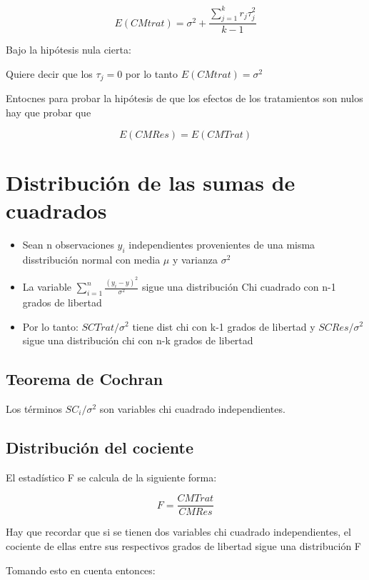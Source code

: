 \documentclass[
]{article}
\begin{document}
\[
E(CMtrat)=\sigma^2+\frac{\sum^k_{j=1}r_j\tau^2_j}{k-1}
\]

Bajo la hipótesis nula cierta:

Quiere decir que los \(\tau_j=0\) por lo tanto \(E(CMtrat)=\sigma^2\)

Entocnes para probar la hipótesis de que los efectos de los tratamientos
son nulos hay que probar que

\[
E(CMRes)=E(CMTrat)
\]

\section{Distribución de las sumas de
cuadrados}\label{distribuciuxf3n-de-las-sumas-de-cuadrados}

\begin{itemize}
\item
  Sean n observaciones \(y_i\) independientes provenientes de una misma
  disstribución normal con media \(\mu\) y varianza \(\sigma^2\)
\item
  La variable \(\sum^n_{i=1}\frac{(y_i-y)^2}{\sigma^2}\) sigue una
  distribución Chi cuadrado con n-1 grados de libertad
\item
  Por lo tanto: \(SCTrat/\sigma^2\) tiene dist chi con k-1 grados de
  libertad y \(SCRes/\sigma^2\) sigue una distribución chi con n-k
  grados de libertad
\end{itemize}

\subsection{Teorema de Cochran}\label{teorema-de-cochran}

Los términos \(SC_i/\sigma^2\) son variables chi cuadrado
independientes.

\subsection{Distribución del
cociente}\label{distribuciuxf3n-del-cociente}

El estadístico F se calcula de la siguiente forma:

\[
F=\frac{CMTrat}{CMRes}
\]

Hay que recordar que si se tienen dos variables chi cuadrado
independientes, el cociente de ellas entre sus respectivos grados de
libertad sigue una distribución F

Tomando esto en cuenta entonces:
\end{document}
